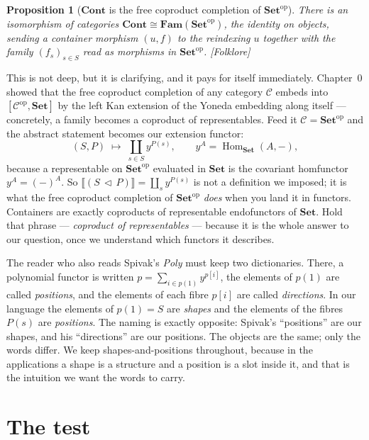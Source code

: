 \documentclass[11pt]{article}
\theoremstyle{plain}
\newtheorem{proposition}[theorem]{Proposition}
\theoremstyle{definition}
\newcommand{\Set}{\mathbf{Set}}
\newcommand{\Cont}{\mathbf{Cont}}
\newcommand{\Fam}{\mathbf{Fam}}
\newcommand{\op}{^{\mathrm{op}}}
\DeclareMathOperator{\Hom}{Hom}
\newcommand{\iso}{\cong}
\newcommand{\ext}[1]{\llbracket #1 \rrbracket}
\newcommand{\cont}[2]{(#1\,\triangleleft\,#2)}
\newcommand{\y}{y}
\newcommand{\prov}[1]{\hfill\textsf{[#1]}}
\begin{document}
\begin{proposition}[$\Cont$ is the free coproduct completion of $\Set\op$]
\label{prop:fam}
There is an isomorphism of categories $\Cont\iso\Fam(\Set\op)$, the identity on
objects, sending a container morphism $(u,f)$ to the reindexing $u$ together with the
family $(f_s)_{s\in S}$ read as morphisms in $\Set\op$.
\prov{Folklore}
\end{proposition}

This is not deep, but it is clarifying, and it pays for itself immediately. Chapter~0
showed that the free coproduct completion of any category $\mathcal C$ embeds into
$[\mathcal C\op,\Set]$ by the left Kan extension of the Yoneda embedding along itself
--- concretely, a family becomes a coproduct of representables. Feed it $\mathcal
C=\Set\op$ and the abstract statement becomes our extension functor:
\[
  (S,P) \;\longmapsto\; \coprod_{s\in S}\y^{P(s)}, \qquad
  \y^{A} = \Hom_{\Set}(A,-),
\]
because a representable on $\Set\op$ evaluated in $\Set$ is the covariant homfunctor
$\y^A = (-)^A$. So $\ext{\cont SP}=\coprod_s\y^{P(s)}$ is not a definition we imposed;
it is what the free coproduct completion of $\Set\op$ \emph{does} when you land it in
functors. Containers are exactly coproducts of representable endofunctors of $\Set$.
Hold that phrase --- \emph{coproduct of representables} --- because it is the whole
answer to our question, once we understand which functors it describes.

\begin{warnbox}
The reader who also reads Spivak's \emph{Poly} must keep two dictionaries. There, a
polynomial functor is written $p=\sum_{i\in p(1)}\y^{p[i]}$, the elements of $p(1)$
are called \emph{positions}, and the elements of each fibre $p[i]$ are called
\emph{directions}. In our language the elements of $p(1)=S$ are \emph{shapes} and the
elements of the fibres $P(s)$ are \emph{positions}. The naming is exactly opposite:
Spivak's ``positions'' are our shapes, and his ``directions'' are our positions. The
objects are the same; only the words differ. We keep shapes-and-positions throughout,
because in the applications a shape is a structure and a position is a slot inside it,
and that is the intuition we want the words to carry.
\end{warnbox}

\section{The test}
\label{sec:test}
\end{document}
